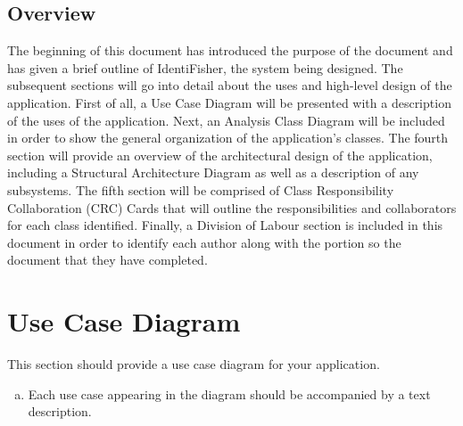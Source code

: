 \documentclass[]{article}
\begin{document}
\subsection{Overview}
\label{sub:overview}
	The beginning of this document has introduced the purpose of the document and has given a brief outline of IdentiFisher, the system being designed. The subsequent sections will go into detail about the uses and high-level design of the application. First of all, a Use Case Diagram will be presented with a description of the uses of the application. Next, an Analysis Class Diagram will be included in order to show the general organization of the application's classes. The fourth section will provide an overview of the architectural design of the application, including a Structural Architecture Diagram as well as a description of any subsystems. The fifth section will be comprised of Class Responsibility Collaboration (CRC) Cards that will outline the responsibilities and collaborators for each class identified. Finally, a Division of Labour section is included in this document in order to identify each author along with the portion so the document that they have completed.


\section{Use Case Diagram}
\label{sec:use_case_diagram}
This section should provide a use case diagram for your application.
\begin{enumerate}[a)]
	\item Each use case appearing in the diagram should be accompanied by a text description.
\end{enumerate}
\end{document}
